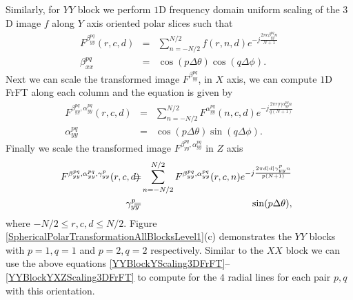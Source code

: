 \documentclass{UCF_ETD}
\begin{document}
 Similarly, for $YY$ block we perform $1$D frequency domain uniform scaling of the $3$D image $f$ along $Y$ axis oriented polar slices such that
 \begin{eqnarray} \label{YYBlockYScaling3DFrFT}
 F^{\beta^{pq}_{yy}} (r,c,d) & = & \sum\limits_{n=-N/2}^{N/2} f(r,n,d) e^{-j\frac{2\pi c\beta^{pq}_{yy} n}{N+1}} \nonumber \\
 \beta^{pq}_{xx} & = & \cos (p\Delta \theta) \cos (q\Delta \phi). %
 \end{eqnarray}
 Next we can scale the transformed image $F^{\beta^{pq}_{yy}}$, in $X$ axis, we can compute $1$D FrFT along each column and the equation is given by
 \begin{eqnarray} \label{YYBlockYXScaling3DFrFT}
 F^{\beta^{pq}_{yy}, \alpha^{pq}_{yy} }(r,c,d) &=& \sum\limits_{n=-N/2}^{N/2}F^{\alpha^{pq}_{yy}} (n,c,d) e^{-j\frac{2\pi r |r| \alpha^{pq}_{yy} n}{q(N+1)}}\nonumber \\
 \alpha^{pq}_{yy} &=& \cos (p\Delta \theta) \sin (q\Delta \phi). %
 \end{eqnarray}
 Finally we scale the transformed image $F^{\beta^{pq}_{yy}, \alpha^{pq}_{yy} }$ in $Z$ axis
 \begin{eqnarray} \label{YYBlockYXZScaling3DFrFT}
 \hskip-0.08in  F^{\beta^{pq}_{yy}, \alpha^{pq}_{yy},  \gamma^{p}_{yy} } (r,c,d) & \hskip-0.12in = & \hskip-0.12in \sum\limits_{n=-N/2}^{N/2}F^{\beta^{pq}_{yy}, \alpha^{pq}_{yy}} (r,c,n) e^{-j\frac{2\pi d |d| \gamma^{p}_{yy} n}{p(N+1)}}\nonumber \\
 \hskip-0.08in  \gamma^{p}_{yy}  & \hskip-0.12in =  & \hskip-0.08in  \sin (p\Delta \theta), %
 \end{eqnarray}
 where $-N/2 \leq r,c,d \leq N/2$. Figure \ref{SphericalPolarTransformationAllBlocksLevel1}(c) demonstrates the $YY$ blocks with $p = 1,q = 1$ and  $p = 2,q = 2$ respectively.
 Similar to the $XX$ block we can use the above equations \eqref{YYBlockYScaling3DFrFT}--\eqref{YYBlockYXZScaling3DFrFT} to compute for the $4$ radial lines for each pair $p,q$ with this orientation.
 
\end{document}
